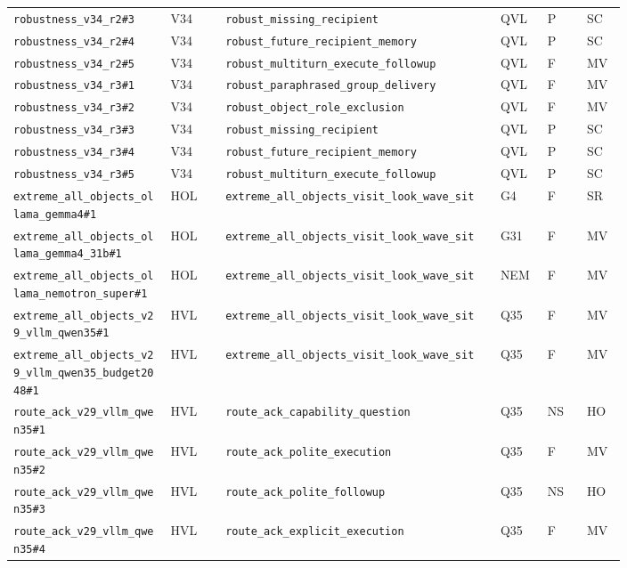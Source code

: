 \begin{landscape}
\begin{longtable}{@{}p{0.205\linewidth}p{0.075\linewidth}p{0.35\linewidth}p{0.06\linewidth}p{0.055\linewidth}p{0.055\linewidth}@{}}
\nolinkurl{robustness_v34_r2#3} & V34 & \nolinkurl{robust_missing_recipient} & QVL & P & SC\\
\nolinkurl{robustness_v34_r2#4} & V34 & \nolinkurl{robust_future_recipient_memory} & QVL & P & SC\\
\nolinkurl{robustness_v34_r2#5} & V34 & \nolinkurl{robust_multiturn_execute_followup} & QVL & F & MV\\
\nolinkurl{robustness_v34_r3#1} & V34 & \nolinkurl{robust_paraphrased_group_delivery} & QVL & F & MV\\
\nolinkurl{robustness_v34_r3#2} & V34 & \nolinkurl{robust_object_role_exclusion} & QVL & F & MV\\
\nolinkurl{robustness_v34_r3#3} & V34 & \nolinkurl{robust_missing_recipient} & QVL & P & SC\\
\nolinkurl{robustness_v34_r3#4} & V34 & \nolinkurl{robust_future_recipient_memory} & QVL & P & SC\\
\nolinkurl{robustness_v34_r3#5} & V34 & \nolinkurl{robust_multiturn_execute_followup} & QVL & P & SC\\
\nolinkurl{extreme_all_objects_ollama_gemma4#1} & HOL & \nolinkurl{extreme_all_objects_visit_look_wave_sit} & G4 & F & SR\\
\nolinkurl{extreme_all_objects_ollama_gemma4_31b#1} & HOL & \nolinkurl{extreme_all_objects_visit_look_wave_sit} & G31 & F & MV\\
\nolinkurl{extreme_all_objects_ollama_nemotron_super#1} & HOL & \nolinkurl{extreme_all_objects_visit_look_wave_sit} & NEM & F & MV\\
\nolinkurl{extreme_all_objects_v29_vllm_qwen35#1} & HVL & \nolinkurl{extreme_all_objects_visit_look_wave_sit} & Q35 & F & MV\\
\nolinkurl{extreme_all_objects_v29_vllm_qwen35_budget2048#1} & HVL & \nolinkurl{extreme_all_objects_visit_look_wave_sit} & Q35 & F & MV\\
\nolinkurl{route_ack_v29_vllm_qwen35#1} & HVL & \nolinkurl{route_ack_capability_question} & Q35 & NS & HO\\
\nolinkurl{route_ack_v29_vllm_qwen35#2} & HVL & \nolinkurl{route_ack_polite_execution} & Q35 & F & MV\\
\nolinkurl{route_ack_v29_vllm_qwen35#3} & HVL & \nolinkurl{route_ack_polite_followup} & Q35 & NS & HO\\
\nolinkurl{route_ack_v29_vllm_qwen35#4} & HVL & \nolinkurl{route_ack_explicit_execution} & Q35 & F & MV\\
\end{longtable}
\end{landscape}